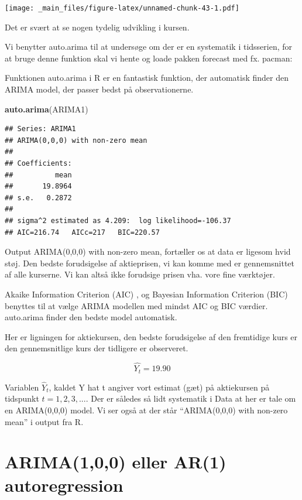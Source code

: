 \documentclass[]{book}
\newenvironment{Shaded}{\begin{snugshade}}{\end{snugshade}}
\newcommand{\KeywordTok}[1]{\textcolor[rgb]{0.13,0.29,0.53}{\textbf{#1}}}
\newcommand{\NormalTok}[1]{#1}
\begin{document}
\texttt{[image: \_main\_files/figure-latex/unnamed-chunk-43-1.pdf]}

Det er svært at se nogen tydelig udvikling i kursen.

Vi benytter auto.arima til at undersøge om der er en systematik i tidsserien, for at bruge denne funktion skal vi hente og loade pakken forecast med fx. pacman:

Funktionen auto.arima i R er en fantastisk funktion, der automatisk finder den ARIMA model, der passer bedst på observationerne.

\begin{Shaded}
\begin{Highlighting}[]
\KeywordTok{auto.arima}\NormalTok{(ARIMA1)}
\end{Highlighting}
\end{Shaded}

\begin{verbatim}
## Series: ARIMA1 
## ARIMA(0,0,0) with non-zero mean 
## 
## Coefficients:
##          mean
##       19.8964
## s.e.   0.2872
## 
## sigma^2 estimated as 4.209:  log likelihood=-106.37
## AIC=216.74   AICc=217   BIC=220.57
\end{verbatim}

Output ARIMA(0,0,0) with non-zero mean, fortæller os at data er ligesom hvid støj. Den bedste forudsigelse af aktieprisen, vi kan komme med er gennemsnittet af alle kurserne. Vi kan altså ikke forudsige prisen vha. vore fine værktøjer.

Akaike Information Criterion (AIC) , og Bayesian Information Criterion (BIC) benyttes til at vælge ARIMA modellen med mindst AIC og BIC værdier. auto.arima finder den bedste model automatisk.

Her er ligningen for aktiekursen, den bedste forudsigelse af den fremtidige kurs er den gennemsnitlige kurs der tidligere er observeret.

\[\hat{Y_t}=19.90\]

Variablen \(\hat{Y}_t\), kaldet Y hat t angiver vort estimat (gæt) på aktiekursen på tidspunkt \(t=1,2,3,...\). Der er således så lidt systematik i Data at her er tale om en ARIMA(0,0,0) model. Vi ser også at der står ``ARIMA(0,0,0) with non-zero mean'' i output fra R.

\hypertarget{arima100-eller-ar1-autoregression}{%
\section{ARIMA(1,0,0) eller AR(1) autoregression}\label{arima100-eller-ar1-autoregression}}
\end{document}
